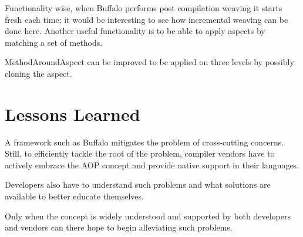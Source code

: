 Functionality wise, when Buffalo performs post compilation weaving it starts fresh each time; it would be interesting to see how incremental weaving can be done here. Another useful functionality is to be able to apply aspects by matching a set of methods.

MethodAroundAspect can be improved to be applied on three levels by possibly cloning the aspect.
\section{Lessons Learned}

A framework such as Buffalo mitigates the problem of cross-cutting concerns. Still, to efficiently tackle the root of the problem, compiler vendors have to actively embrace the AOP concept and provide native support in their languages.

Developers also have to understand such problems and what solutions are available to better educate themselves.

Only when the concept is widely understood and supported by both developers and vendors can there hope to begin alleviating such problems.
